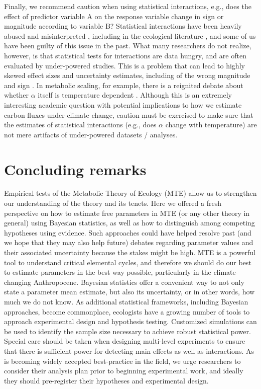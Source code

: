 \documentclass[a4paper,12pt]{article}
\begin{document}
Finally, we recommend caution when using statistical interactions, e.g., does the effect of predictor variable A on the response variable change in sign or magnitude according to variable B? Statistical interactions have been heavily abused and misinterpreted \citep[see Section 16.4 of][]{gelman2020book}, including in the ecological literature \citep{spake2023biolrev}, and some of us have been guilty of this issue in the past. What many researchers do not realize, however, is that statistical tests for interactions are data hungry, and are often evaluated by under-powered studies. This is a problem that can lead to highly skewed effect sizes and uncertainty estimates, including of the wrong magnitude and sign \citep{gelman2014perspsysci}. In metabolic scaling, for example, there is a reignited debate about whether $\alpha$ itself is temperature dependent \citep{glazier2020jcompphysiolb}. Although this is an extremely interesting academic question with potential implications to how we estimate carbon fluxes under climate change, caution must be exercised to make sure that the estimates of statistical interactions (e.g., does $\alpha$ change with temperature) are not mere artifacts of under-powered datasets / analyses.

\section{Concluding remarks}
Empirical tests of the Metabolic Theory of Ecology (MTE) allow us to strengthen our understanding of the theory and its tenets. Here we offered a fresh perspective on how to estimate free parameters in MTE (or any other theory in general) using Bayesian statistics, as well as how to distinguish among competing hypotheses using evidence. Such approaches could have helped resolve past (and we hope that they may also help future) debates regarding parameter values and their associated uncertainty because the stakes might be high. MTE is a powerful tool to understand critical elemental cycles, and therefore we should do our best to estimate parameters in the best way possible, particularly in the climate-changing Anthropocene. Bayesian statistics offer a convenient way to not only state a parameter mean estimate, but also its uncertainty, or in other words, how much we do not know. As additional statistical frameworks, including Bayesian approaches, become commonplace, ecologists have a growing number of tools to approach experimental design and hypothesis testing. Customized simulations can be used to identify the sample size necessary to achieve robust statistical power. Special care should be taken when designing multi-level experiments to ensure that there is sufficient power for detecting main effects as well as interactions. As is becoming widely accepted best-practice in the field, we urge researchers to consider their analysis plan prior to beginning experimental work, and ideally they should pre-register their hypotheses and experimental design.



\end{document}
